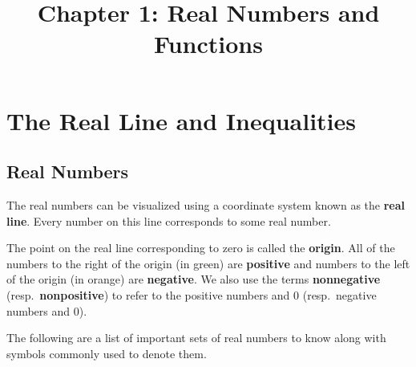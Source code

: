 \documentclass{article}
\title{Chapter 1: Real Numbers and Functions}
\author{}
\date{}
\begin{document}
\maketitle

\section{The Real Line and Inequalities}

\subsection{Real Numbers}

The real numbers can be visualized using a coordinate system known as the \textbf{real line}. Every number on this line corresponds to some real number.

\begin{center}
\end{center}

The point on the real line corresponding to zero is called the \textbf{origin}. All of the numbers to the right of the origin (in green) are \textbf{positive} and numbers to the left of the origin (in orange) are \textbf{negative}. We also use the terms \textbf{nonnegative} (resp.~\textbf{nonpositive}) to refer to the positive numbers and $0$ (resp.~negative numbers and 0).

\vspace{5pt}
The following are a list of important sets of real numbers to know along with symbols commonly used to denote them.
\end{document}
